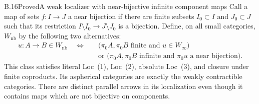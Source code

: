 \begin{claim}{B.16}{Proved}{A weak localizer with near-bijective infinite component maps}
Call a map of sets $f:I\to J$ a near bijection if there are finite
subsets $I_0\subset I$ and $J_0\subset J$ such that its restriction
$I\setminus I_0\to J\setminus J_0$ is a bijection. Define, on all
small categories, $W_{\mathrm{nb}}$ by the following two alternatives:
\[
\begin{split}
u:A\to B\in W_{\mathrm{nb}}\quad\Longleftrightarrow\quad&
\bigl(\pi_0A,\pi_0B\text{ finite and }u\in W_\infty\bigr)\\
&\text{or }\bigl(\pi_0A,\pi_0B\text{ infinite and }
                 \pi_0u\text{ a near bijection}\bigr).
\end{split}
\]
This class satisfies literal Loc~(1), Loc~(2), absolute Loc~(3),
and closure under finite coproducts. Its aspherical categories are
exactly the weakly contractible categories. There are distinct
parallel arrows in its localization even though it contains maps
which are not bijective on components.
\end{claim}
